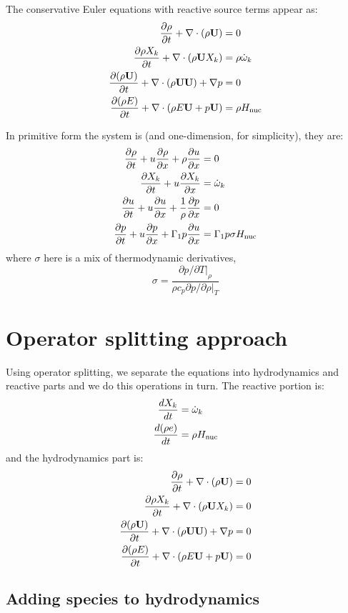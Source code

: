 The conservative Euler equations with reactive source terms
appear as:
\begin{align}
{\frac{{\partial\rho}}{\partial t}} + \nabla \cdot (\rho {\bf U}) &= 0 \\
{\frac{{\partial\rho X_k}}{\partial t}} + \nabla \cdot (\rho {\bf U} X_k) &= \rho {\dot{\omega}}_k \\
{\frac{{\partial(\rho {\bf U})}}{\partial t}} + \nabla \cdot (\rho {\bf U} {\bf U}) + \nabla p &= 0 \\
{\frac{{\partial(\rho E)}}{\partial t}} + \nabla \cdot (\rho E {\bf U} + p {\bf U} ) &= \rho {H_\mathrm{nuc}}
\end{align}

In primitive form the system is (and one-dimension, for simplicity),
they are:
\begin{align}
{\frac{{\partial\rho}}{\partial t}} + u {\frac{{\partial\rho}}{\partial x}} + \rho {\frac{{\partial u}}{\partial x}} &= 0\\
{\frac{{\partial X_k}}{\partial t}} + u {\frac{{\partial X_k}}{\partial x}} &= {\dot{\omega}}_k \\
{\frac{{\partial u}}{\partial t}} + u {\frac{{\partial u}}{\partial x}} + \frac{1}{\rho} {\frac{{\partial p}}{\partial x}} &= 0\\
{\frac{{\partial p}}{\partial t}} + u {\frac{{\partial p}}{\partial x}} + \Gamma_1 p {\frac{{\partial u}}{\partial x}} &= \Gamma_1 p \sigma {H_\mathrm{nuc}}
\end{align}
where $\sigma$ here is a mix of thermodynamic derivatives,
\begin{equation}
\sigma = \frac{\partial p / \partial T |_\rho}{\rho c_p \partial p / \partial \rho |_T}
\end{equation}


\section{Operator splitting approach}

Using operator splitting, we separate the equations into hydrodynamics
and reactive parts and we do this operations in turn.  The reactive 
portion is:
\begin{align}
\frac{dX_k}{dt} &= {\dot{\omega}}_k \\
\frac{d(\rho e)}{dt} &= \rho {H_\mathrm{nuc}}
\end{align}
and the hydrodynamics part is:
\begin{align}
{\frac{{\partial\rho}}{\partial t}} + \nabla \cdot (\rho {\bf U}) &= 0 \\
{\frac{{\partial\rho X_k}}{\partial t}} + \nabla \cdot (\rho {\bf U} X_k) &= 0 \\
{\frac{{\partial(\rho {\bf U})}}{\partial t}} + \nabla \cdot (\rho {\bf U} {\bf U}) + \nabla p &= 0 \\
{\frac{{\partial(\rho E)}}{\partial t}} + \nabla \cdot (\rho E {\bf U} + p {\bf U} ) &= 0
\end{align}



\subsection{Adding species to hydrodynamics}

